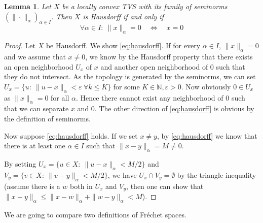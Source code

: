 \documentclass{scrartcl}
\newtheorem{lemma}{Lemma}
\theoremstyle{definition}
\theoremstyle{remark}
\newcommand{\eps}{\varepsilon}
\newcommand{\N}{\mathbb N}
\begin{document}
\begin{lemma}\label{lem:hausdorff}
Let $X$ be a locally convex TVS with its family of seminorms $(\| \cdot \|_\alpha)_{\alpha\in I}$. Then $X$ is Hausdorff if and only if
\begin{equation}\label{eq:hausdorff}
\forall \alpha\in I:~ \|x\|_\alpha = 0\quad \Leftrightarrow \quad x = 0
\end{equation}
\end{lemma}
\begin{proof}
Let $X$ be Hausdorff. We show \eqref{eq:hausdorff}. If for every $\alpha\in I$, $\|x\|_{\alpha}=0$ and we assume that $x\neq 0$, we know by the Hausdorff property that there exists an open neighborhood $U_x$ of $x$ and another open neighborhood of $0$ such that they do not intersect. As the topology is generated by the seminorms, we can set $U_x = \{u:~ \|u-x\|_{\alpha} < \eps~ \forall k\leq K\}$ for some $K\in \N, \eps>0$. Now obviously $0\in U_x$ as $\|x\|_{\alpha} = 0$ for all $\alpha$. Hence there cannot exist any neighborhood of $0$ such that we can separate $x$ and $0$. The other direction of \eqref{eq:hausdorff} is obvious by the definition of seminorms.

Now suppose \eqref{eq:hausdorff} holds. If we set $x\neq y$, by \eqref{eq:hausdorff} we know that there is at least one $\alpha\in I$ such that $\|x-y\|_\alpha = M \neq 0$.

By setting $U_x =\{u\in X:~\|u-x\|_\alpha < M/2 \}$ and $V_y =\{v\in X:~\|v-y\|_\alpha < M/2 \}$, we have $U_x\cap V_y = \emptyset$ by the triangle inequality (assume there is a $w$ both in $U_x$ and $V_y$, then one can show that $\|x-y\|_\alpha \leq \|x-w\|_\alpha + \|w-y\|_\alpha < M$).
\end{proof}

We are going to compare two definitions of Fr\'echet spaces.\newline
\end{document}
